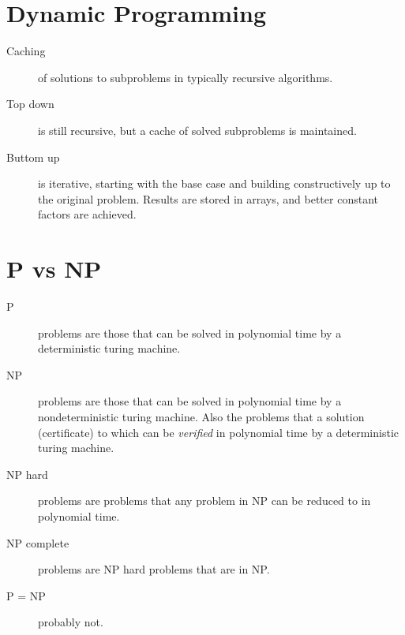 \documentclass[landscape]{cheat}
\begin{document}
\begin{multicols*}{3}
\section{Dynamic Programming}
\begin{description}
    \item[Caching] of solutions to subproblems in typically recursive algorithms.
    \item[Top down] is still recursive, but a cache of solved subproblems is maintained.
    \item[Buttom up] is iterative, starting with the base case and building constructively up to the original problem.
        Results are stored in arrays, and better constant factors are achieved.
\end{description}

\section{P vs NP}
\begin{description}
    \item[P] problems are those that can be solved in polynomial time by a deterministic turing machine.
    \item[NP] problems are those that can be solved in polynomial time by a nondeterministic turing machine.
        Also the problems that a solution (certificate) to which can be \emph{verified} in polynomial time by a deterministic turing machine.
    \item[NP hard] problems are problems that any problem in NP can be reduced to in polynomial time.
    \item[NP complete] problems are NP hard problems that are in NP.
    \item[P = NP] probably not.
\end{description}

\end{multicols*}
\end{document}

